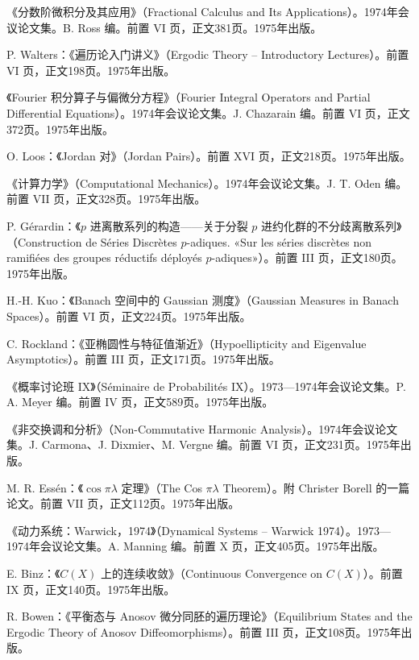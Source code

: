 \begin{description}[style=nextline,leftmargin=1.5em,itemsep=7pt]
\item[第457卷]《分数阶微积分及其应用》（Fractional Calculus and Its Applications）。1974年会议论文集。B. Ross 编。前置 VI 页，正文381页。1975年出版。
\item[第458卷] P. Walters：《遍历论入门讲义》（Ergodic Theory -- Introductory Lectures）。前置 VI 页，正文198页。1975年出版。
\item[第459卷]《Fourier 积分算子与偏微分方程》（Fourier Integral Operators and Partial Differential Equations）。1974年会议论文集。J. Chazarain 编。前置 VI 页，正文372页。1975年出版。
\item[第460卷] O. Loos：《Jordan 对》（Jordan Pairs）。前置 XVI 页，正文218页。1975年出版。
\item[第461卷]《计算力学》（Computational Mechanics）。1974年会议论文集。J. T. Oden 编。前置 VII 页，正文328页。1975年出版。
\item[第462卷] P. Gérardin：《$p$ 进离散系列的构造——关于分裂 $p$ 进约化群的不分歧离散系列》（Construction de Séries Discrètes $p$-adiques. «Sur les séries discrètes non ramifiées des groupes réductifs déployés $p$-adiques»）。前置 III 页，正文180页。1975年出版。
\item[第463卷] H.-H. Kuo：《Banach 空间中的 Gaussian 测度》（Gaussian Measures in Banach Spaces）。前置 VI 页，正文224页。1975年出版。
\item[第464卷] C. Rockland：《亚椭圆性与特征值渐近》（Hypoellipticity and Eigenvalue Asymptotics）。前置 III 页，正文171页。1975年出版。
\item[第465卷]《概率讨论班 IX》（Séminaire de Probabilités IX）。1973—1974年会议论文集。P. A. Meyer 编。前置 IV 页，正文589页。1975年出版。
\item[第466卷]《非交换调和分析》（Non-Commutative Harmonic Analysis）。1974年会议论文集。J. Carmona、J. Dixmier、M. Vergne 编。前置 VI 页，正文231页。1975年出版。
\item[第467卷] M. R. Essén：《$\cos\pi\lambda$ 定理》（The Cos $\pi\lambda$ Theorem）。附 Christer Borell 的一篇论文。前置 VII 页，正文112页。1975年出版。
\item[第468卷]《动力系统：Warwick，1974》（Dynamical Systems -- Warwick 1974）。1973—1974年会议论文集。A. Manning 编。前置 X 页，正文405页。1975年出版。
\item[第469卷] E. Binz：《$C(X)$ 上的连续收敛》（Continuous Convergence on $C(X)$）。前置 IX 页，正文140页。1975年出版。
\item[第470卷] R. Bowen：《平衡态与 Anosov 微分同胚的遍历理论》（Equilibrium States and the Ergodic Theory of Anosov Diffeomorphisms）。前置 III 页，正文108页。1975年出版。

\end{description}
